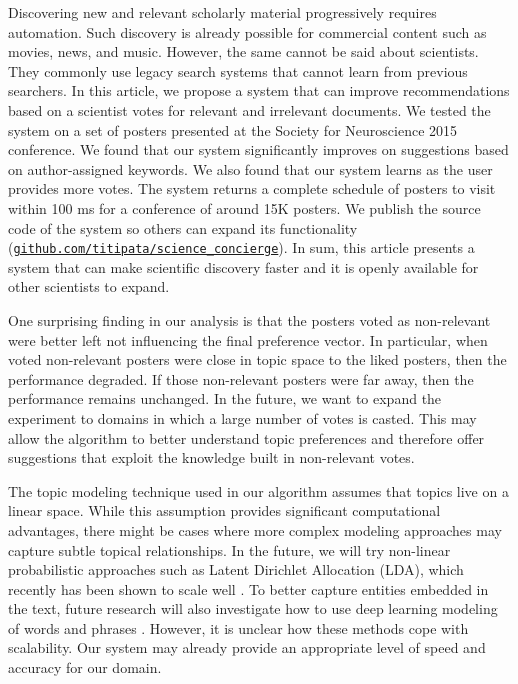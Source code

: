 \documentclass[a4paper]{article}
\begin{document}
Discovering new and relevant scholarly material progressively requires automation. Such discovery is already possible for
commercial content such as movies, news, and music. However, the same cannot be said about scientists. They commonly use legacy search systems that cannot learn from previous searchers. In this article, we propose a system that can improve recommendations based on a scientist votes for relevant and irrelevant documents. We tested the system on a set of posters presented at the Society for Neuroscience 2015 conference. We found that our system significantly improves on suggestions based on author-assigned keywords. We also found that our system learns as the user provides more votes. The system returns a complete schedule of posters to visit within 100 ms for a conference of around 15K posters. We publish the source code of the system so others can expand its functionality (\href{https://github.com/titipata/science_concierge}{\texttt{github.com/titipata/science\_concierge}}). In sum, this article presents a system that can make scientific discovery faster and it is openly available for other scientists to expand.


One surprising finding in our analysis is that the posters voted as non-relevant were better left not influencing the final preference vector. In particular, when voted non-relevant posters were close in topic space to the liked posters, then the performance degraded. If those non-relevant posters were far away, then the performance remains unchanged. In the future, we want to expand the experiment to domains in which a large number of votes is casted. This may allow the algorithm to better understand topic preferences and therefore offer suggestions that exploit the knowledge built in non-relevant votes.


The topic modeling technique used in our algorithm assumes that topics live on a linear space. While this assumption provides significant computational advantages, there might be cases where more complex modeling approaches may capture subtle topical relationships. In the future, we will try non-linear probabilistic approaches such as Latent Dirichlet Allocation (LDA), which recently has been shown to scale well \cite{hoffman2010online}. To better capture entities embedded in the text, future research will also investigate how to use deep learning modeling of words and phrases \cite{mikolov2013efficient, pennington2014glove}. However, it is unclear how these methods cope with scalability. Our system may already provide an appropriate level of speed and accuracy for our domain.
\end{document}
